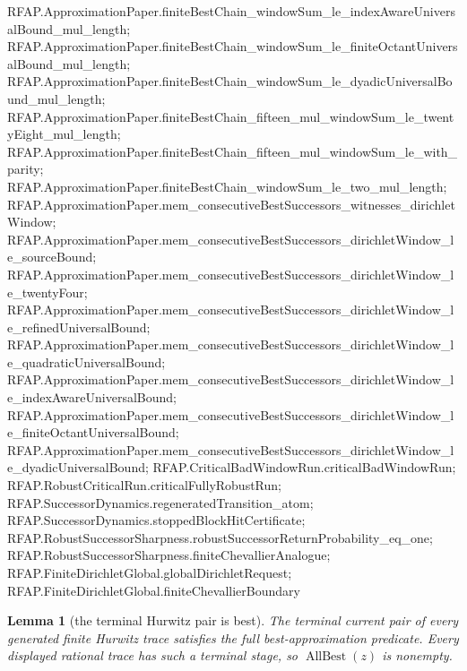 \documentclass[11pt]{article}
\newtheorem{lemma}[lemma]{Lemma}
\begin{document}
{RFAP.ApproximationPaper.finiteBestChain_windowSum_le_indexAwareUniversalBound_mul_length;
RFAP.ApproximationPaper.finiteBestChain_windowSum_le_finiteOctantUniversalBound_mul_length;
RFAP.ApproximationPaper.finiteBestChain_windowSum_le_dyadicUniversalBound_mul_length;
RFAP.ApproximationPaper.finiteBestChain_fifteen_mul_windowSum_le_twentyEight_mul_length;
RFAP.ApproximationPaper.finiteBestChain_fifteen_mul_windowSum_le_with_parity;
RFAP.ApproximationPaper.finiteBestChain_windowSum_le_two_mul_length;
RFAP.ApproximationPaper.mem_consecutiveBestSuccessors_witnesses_dirichletWindow;
RFAP.ApproximationPaper.mem_consecutiveBestSuccessors_dirichletWindow_le_sourceBound;
RFAP.ApproximationPaper.mem_consecutiveBestSuccessors_dirichletWindow_le_twentyFour;
RFAP.ApproximationPaper.mem_consecutiveBestSuccessors_dirichletWindow_le_refinedUniversalBound;
RFAP.ApproximationPaper.mem_consecutiveBestSuccessors_dirichletWindow_le_quadraticUniversalBound;
RFAP.ApproximationPaper.mem_consecutiveBestSuccessors_dirichletWindow_le_indexAwareUniversalBound;
RFAP.ApproximationPaper.mem_consecutiveBestSuccessors_dirichletWindow_le_finiteOctantUniversalBound;
RFAP.ApproximationPaper.mem_consecutiveBestSuccessors_dirichletWindow_le_dyadicUniversalBound;
RFAP.CriticalBadWindowRun.criticalBadWindowRun;
RFAP.RobustCriticalRun.criticalFullyRobustRun;
RFAP.SuccessorDynamics.regeneratedTransition_atom;
RFAP.SuccessorDynamics.stoppedBlockHitCertificate;
RFAP.RobustSuccessorSharpness.robustSuccessorReturnProbability_eq_one;
RFAP.RobustSuccessorSharpness.finiteChevallierAnalogue;
RFAP.FiniteDirichletGlobal.globalDirichletRequest;
RFAP.FiniteDirichletGlobal.finiteChevallierBoundary}

\begin{lemma}[the terminal Hurwitz pair is best]
\label{lem:terminal-hurwitz-best}
The terminal current pair of every generated finite Hurwitz trace satisfies
the full best-approximation predicate.  Every displayed rational trace has
such a terminal stage, so $\operatorname{AllBest}(z)$ is nonempty.
\end{lemma}
\end{document}
